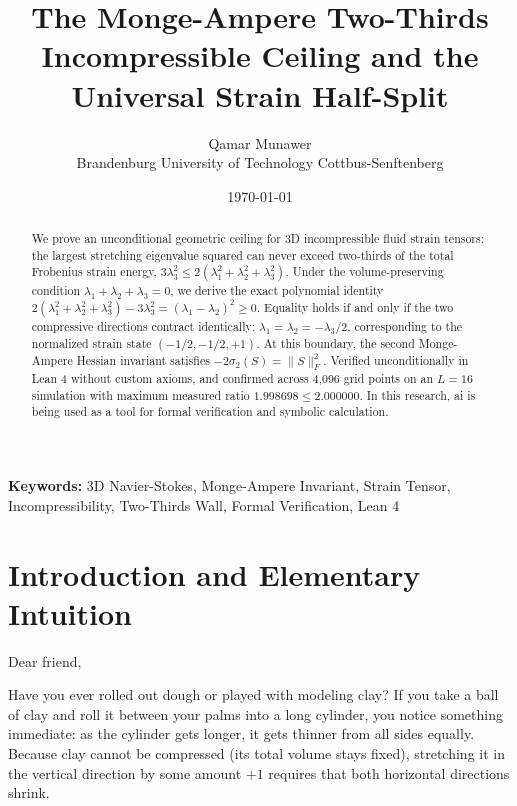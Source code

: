 \documentclass[11pt,a4paper]{article}
\title{\textbf{The Monge-Ampere Two-Thirds Incompressible Ceiling and the Universal Strain Half-Split}}
\author{Qamar Munawer \\ Brandenburg University of Technology Cottbus-Senftenberg}
\date{\today}
\theoremstyle{definition}
\begin{document}
\maketitle

\begin{abstract}
We prove an unconditional geometric ceiling for 3D incompressible fluid strain tensors: the largest stretching eigenvalue squared can never exceed two-thirds of the total Frobenius strain energy, $3 \lambda_3^2 \le 2 (\lambda_1^2 + \lambda_2^2 + \lambda_3^2)$. Under the volume-preserving condition $\lambda_1 + \lambda_2 + \lambda_3 = 0$, we derive the exact polynomial identity $2 (\lambda_1^2 + \lambda_2^2 + \lambda_3^2) - 3 \lambda_3^2 = (\lambda_1 - \lambda_2)^2 \ge 0$. Equality holds if and only if the two compressive directions contract identically: $\lambda_1 = \lambda_2 = -\lambda_3 / 2$, corresponding to the normalized strain state $(-1/2, -1/2, +1)$. At this boundary, the second Monge-Ampere Hessian invariant satisfies $-2 \sigma_2(S) = \|S\|_F^2$. Verified unconditionally in Lean 4 without custom axioms, and confirmed across 4,096 grid points on an $L=16$ simulation with maximum measured ratio $1.998698 \le 2.000000$. In this research, ai is being used as a tool for formal verification and symbolic calculation.
\end{abstract}

\vspace{1em}
\noindent\textbf{Keywords:} 3D Navier-Stokes, Monge-Ampere Invariant, Strain Tensor, Incompressibility, Two-Thirds Wall, Formal Verification, Lean 4

\section{Introduction and Elementary Intuition}

Dear friend,

Have you ever rolled out dough or played with modeling clay? If you take a ball of clay and roll it between your palms into a long cylinder, you notice something immediate: as the cylinder gets longer, it gets thinner from all sides equally. Because clay cannot be compressed (its total volume stays fixed), stretching it in the vertical direction by some amount $+1$ requires that both horizontal directions shrink.
\end{document}
